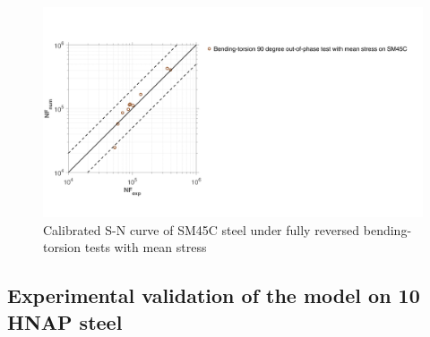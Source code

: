 \documentclass[3p,times,number,review]{elsarticle}
\begin{document}
\begin{figure}[!h]
	\centering
	\includegraphics[width=\textwidth]{figures//bt2D_m_SM45C_err1.png} 
	\caption{Calibrated S-N curve of SM45C steel under fully reversed bending-torsion tests with mean stress}
	\label{fig.bt2DmSM45Cerr1}
\end{figure}

\clearpage
\subsection{Experimental validation of the model on 10 HNAP steel}
\end{document}
